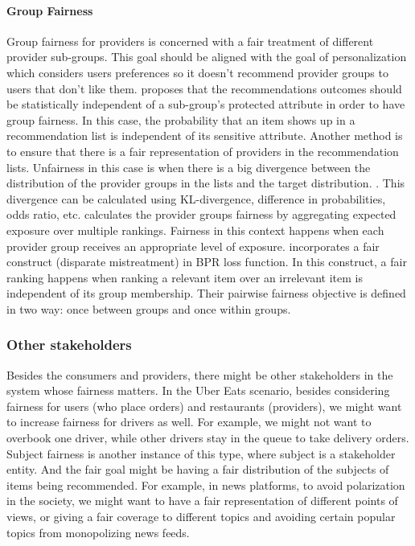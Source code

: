 \paragraph{Group Fairness}
Group fairness for providers is concerned with a fair treatment of different provider sub-groups. This goal should be aligned with the goal of personalization which considers users preferences so it doesn't recommend provider groups to users that don't like them. \cite{kamishima2018recommendation} proposes that the recommendations outcomes should be statistically independent of a sub-group's protected attribute in order to have group fairness. In this case, the probability that an item shows up in a recommendation list is independent of its sensitive attribute.
Another method is to ensure that there is a fair representation of providers in the recommendation lists. Unfairness in this case is when there is a big divergence between the distribution of the provider groups in the lists and the target distribution. \cite{yang2017measuring,das2019conceptual}. This divergence can be calculated using KL-divergence, difference in probabilities, odds ratio, etc. \cite{biega2018equity} calculates the provider groups fairness by aggregating expected exposure over multiple rankings. Fairness in this context happens when each provider group receives an appropriate level of exposure. \cite{beutel2019fairness} incorporates a fair construct (disparate mistreatment) in BPR\cite{rendlebpr2009} loss function. In this construct, a fair ranking happens when ranking a relevant item over an irrelevant item is independent of its group membership. Their pairwise fairness objective is defined in two way: once between groups and once within groups.
    
\subsubsection{Other stakeholders}     
Besides the consumers and providers, there might be other stakeholders in the system whose fairness matters. In the Uber Eats scenario, besides considering fairness for users (who place orders) and restaurants (providers), we might want to increase fairness for drivers as well. For example, we might not want to overbook one driver, while other drivers stay in the queue to take delivery orders.
Subject fairness is another instance of this type, where subject is a stakeholder entity. And the fair goal might be having a fair distribution of the subjects of items being recommended. For example, in news platforms, to avoid polarization in the society, we might want to have a fair representation of different points of views, or giving a fair coverage to different topics and avoiding certain popular topics from monopolizing news feeds.

